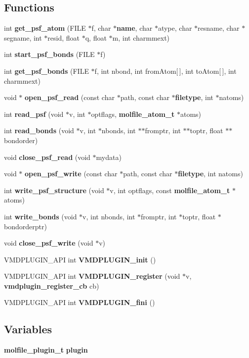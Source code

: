 \subsection*{Functions}
\begin{CompactItemize}
\item 
int {\bf get\_\-psf\_\-atom} (FILE $\ast$f, char $\ast${\bf name}, char $\ast$atype, char $\ast$resname, char $\ast$segname, int $\ast$resid, float $\ast$q, float $\ast$m, int charmmext)
\item 
int {\bf start\_\-psf\_\-bonds} (FILE $\ast$f)
\item 
int {\bf get\_\-psf\_\-bonds} (FILE $\ast$f, int nbond, int from\-Atom[$\,$], int to\-Atom[$\,$], int charmmext)
\item 
void $\ast$ {\bf open\_\-psf\_\-read} (const char $\ast$path, const char $\ast${\bf filetype}, int $\ast$natoms)
\item 
int {\bf read\_\-psf} (void $\ast$v, int $\ast$optflags, {\bf molfile\_\-atom\_\-t} $\ast$atoms)
\item 
int {\bf read\_\-bonds} (void $\ast$v, int $\ast$nbonds, int $\ast$$\ast$fromptr, int $\ast$$\ast$toptr, float $\ast$$\ast$bondorder)
\item 
void {\bf close\_\-psf\_\-read} (void $\ast$mydata)
\item 
void $\ast$ {\bf open\_\-psf\_\-write} (const char $\ast$path, const char $\ast${\bf filetype}, int natoms)
\item 
int {\bf write\_\-psf\_\-structure} (void $\ast$v, int optflags, const {\bf molfile\_\-atom\_\-t} $\ast$atoms)
\item 
int {\bf write\_\-bonds} (void $\ast$v, int nbonds, int $\ast$fromptr, int $\ast$toptr, float $\ast$bondorderptr)
\item 
void {\bf close\_\-psf\_\-write} (void $\ast$v)
\item 
VMDPLUGIN\_\-API int {\bf VMDPLUGIN\_\-init} ()
\item 
VMDPLUGIN\_\-API int {\bf VMDPLUGIN\_\-register} (void $\ast$v, {\bf vmdplugin\_\-register\_\-cb} cb)
\item 
VMDPLUGIN\_\-API int {\bf VMDPLUGIN\_\-fini} ()
\end{CompactItemize}
\subsection*{Variables}
\begin{CompactItemize}
\item 
{\bf molfile\_\-plugin\_\-t} {\bf plugin}
\end{CompactItemize}


